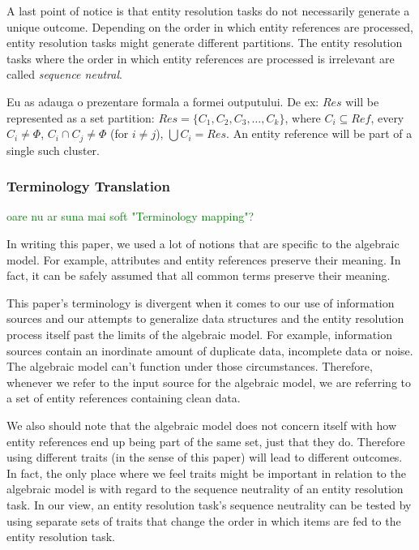 \documentclass[lettersize,journal]{IEEEtran}
\begin{document}
    A last point of notice is that entity resolution tasks do not necessarily
    generate a unique outcome\cite{Tal11}.
    Depending on the order in which entity references are processed, entity
    resolution tasks might generate different partitions.
    The entity resolution tasks where the order in which entity references are
    processed is irrelevant are called \textit{sequence neutral}\cite{Tal11}.


    Eu as adauga o prezentare formala a formei outputului.
    De ex: $Res$ will be represented as a set partition: $Res = \{C_1, C_2, C_3, \ldots, C_k\}$, where $C_i \subseteq Ref$, every $C_i \neq \Phi$, $C_i \cap C_j \neq \Phi$ (for $i \neq j$), $\bigcup C_i = Res$. An entity reference will be part of a single such cluster. 


    \subsubsection[algrel]{Terminology Translation}\label{subsubsec:algrel}
    \textcolor{green}{oare nu ar suna mai soft "Terminology mapping"?}

    In writing this paper, we used a lot of notions that are specific to the
    algebraic model.
    For example, attributes and entity references preserve their meaning.
    In fact, it can be safely assumed that all common terms preserve their
    meaning.
    
    This paper's terminology is divergent when it comes to our use of
    information sources and our attempts to generalize data structures and the
    entity resolution process itself past the limits of the algebraic model.
    For example, information sources contain an inordinate amount of duplicate
    data, incomplete data or noise.
    The algebraic model can't function under those circumstances.
    Therefore, whenever we refer to the input source for the algebraic model,
    we are referring to a set of entity references containing clean data.
    
    We also should note that the algebraic model does not concern itself with
    how entity references end up being part of the same set, just that they do.
    Therefore using different traits (in the sense of this paper) will lead to
    different outcomes.
    In fact, the only place where we feel traits might be important in relation
    to the algebraic model is with regard to the sequence neutrality of an
    entity resolution task.
    In our view, an entity resolution task's sequence neutrality can be tested
    by using separate sets of traits that change the order in which items are
    fed to the entity resolution task.
\end{document}
